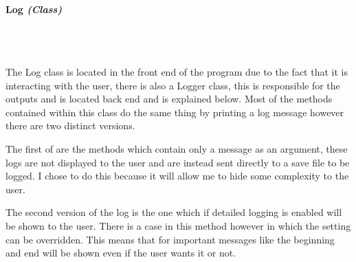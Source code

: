 \begin{FlushLeft}
    \bk
    \pagebreak
    \paragraph{Log \textit{(Class)}} \mbox{} \\

    \begin{figure}[H]
        \centering
    \end{figure}\\

    The Log class is located in the front end of the program due to the fact that it is interacting with the user, there is also a Logger class, this is responsible for the outputs and is located back end and is explained below. Most of the methods contained within this class do the same thing by printing a log message however there are two distinct versions. \\ \bk

    The first of are the methods which contain only a message as an argument, these logs are not displayed to the user and are instead sent directly to a save file to be logged. I chose to do this because it will allow me to hide some complexity to the user. \\ \bk

    The second version of the log is the one which if detailed logging is enabled will be shown to the user. There is a case in this method however in which the setting can be overridden. This means that for important messages like the beginning and end will be shown even if the user wants it or not. \\ \bk


\end{FlushLeft}
